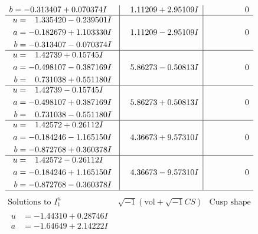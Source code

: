 \documentclass[1p]{elsarticle_modified}
\theoremstyle{definition}
\newcommand{\I}{\sqrt{-1}}
\begin{document}
$$\begin{array}{c|c|c}
\begin{aligned}
b &= -0.313407 + 0.070374 I\end{aligned}
 & \phantom{-}1.11209 + 2.95109 I & \phantom{-0.000000 } 0 \\ \hline\begin{aligned}
u &= \phantom{-}1.335420 - 0.239501 I \\
a &= -0.182679 + 1.103330 I \\
b &= -0.313407 - 0.070374 I\end{aligned}
 & \phantom{-}1.11209 - 2.95109 I & \phantom{-0.000000 } 0 \\ \hline\begin{aligned}
u &= \phantom{-}1.42739 + 0.15745 I \\
a &= -0.498107 - 0.387169 I \\
b &= \phantom{-}0.731038 + 0.551180 I\end{aligned}
 & \phantom{-}5.86273 - 0.50813 I & \phantom{-0.000000 } 0 \\ \hline\begin{aligned}
u &= \phantom{-}1.42739 - 0.15745 I \\
a &= -0.498107 + 0.387169 I \\
b &= \phantom{-}0.731038 - 0.551180 I\end{aligned}
 & \phantom{-}5.86273 + 0.50813 I & \phantom{-0.000000 } 0 \\ \hline\begin{aligned}
u &= \phantom{-}1.42572 + 0.26112 I \\
a &= -0.184246 - 1.165150 I \\
b &= -0.872768 + 0.360378 I\end{aligned}
 & \phantom{-}4.36673 + 9.57310 I & \phantom{-0.000000 } 0 \\ \hline\begin{aligned}
u &= \phantom{-}1.42572 - 0.26112 I \\
a &= -0.184246 + 1.165150 I \\
b &= -0.872768 - 0.360378 I\end{aligned}
 & \phantom{-}4.36673 - 9.57310 I & \phantom{-0.000000 } 0\\
 \hline 
 \end{array}$$\newpage$$\begin{array}{c|c|c}  
\text{Solutions to }I^u_{1}& \I (\text{vol} + \sqrt{-1}CS) & \text{Cusp shape}\\
 \hline 
\begin{aligned}
u &= -1.44310 + 0.28746 I \\
a &= -1.64649 + 2.14222 I \\

\end{aligned}
\end{array}$$
\end{document}
